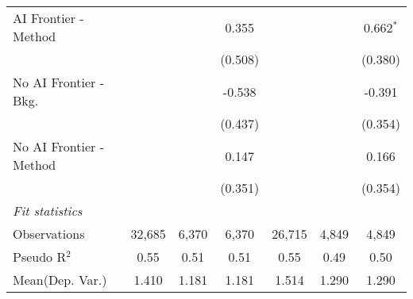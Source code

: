 \begin{tabular}{lcccccc}
   AI Frontier - Method    &               &               & 0.355         &               &               & 0.662$^{*}$\\   
                           &               &               & (0.508)       &               &               & (0.380)\\   
   No AI Frontier - Bkg.   &               &               & -0.538        &               &               & -0.391\\   
                           &               &               & (0.437)       &               &               & (0.354)\\   
   No AI Frontier - Method &               &               & 0.147         &               &               & 0.166\\   
                           &               &               & (0.351)       &               &               & (0.354)\\   
   \midrule
   \emph{Fit statistics}\\
   Observations            & 32,685        & 6,370         & 6,370         & 26,715        & 4,849         & 4,849\\  
   Pseudo R$^2$            & 0.55          & 0.51          & 0.51          & 0.55          & 0.49          & 0.50\\  
Mean(Dep. Var.) & 1.410 & 1.181 & 1.181 & 1.514 & 1.290 & 1.290 \\
   

\end{tabular}
